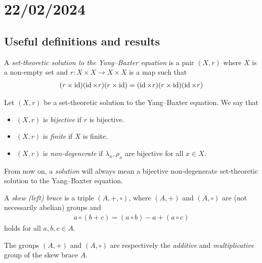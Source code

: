 
\section{22/02/2024}

\subsection{Useful definitions and results}

\begin{definition}
        A \emph{set-theoretic solution to the Yang--Baxter equation} is a pair $(X,r)$ where $X$ is a non-empty set and $r: X\times X \to X \times X$ is a map such that
        \begin{align}
            (r\times \operatorname{id})(\operatorname{id} \times r)(r\times \operatorname{id}) = (\operatorname{id} \times r)(r\times \operatorname{id})(\operatorname{id} \times r)
        \end{align}
\end{definition}

\begin{definition}
        Let $(X,r)$ be a set-theoretic solution to the  Yang--Baxter equation. We say that 
        \begin{itemize}
            \item $(X,r)$ is \emph{bijective} if $r$ is bijective.
            \item $(X,r)$ is \emph{finite} if $X$ is finite.
            \item $(X,r)$ is \emph{non-degenerate} if $\lambda_x,\rho_x$ are bijective for all $x\in X$.
        \end{itemize}
    \end{definition}

\begin{convention}
        From now on, a \emph{solution}  will always mean a bijective non-degenerate set-theoretic solution to the Yang--Baxter equation.
\end{convention}

\begin{definition}
         A \emph{skew (left) brace} is a triple $(A,+,\circ)$, where 
        $(A,+)$ and $(A,\circ)$ 
    	are (not necessarily abelian) 
    	groups and 
    	\begin{align}
    	    a\circ(b+c)=(a\circ b)-a+(a\circ c)
    	\end{align}
    	holds for all $a,b,c\in A$. 
    
    The groups $(A,+)$ and $(A,\circ)$ are respectively the \emph{additive} and \emph{multiplicative} group	of the skew brace $A$.
\end{definition}

